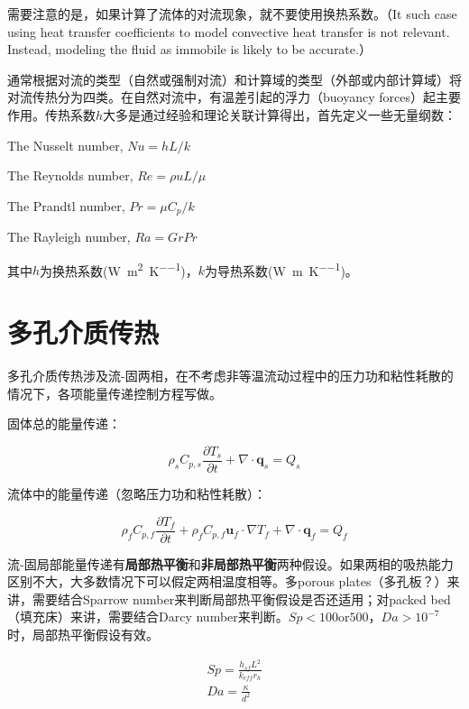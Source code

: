 需要注意的是，如果计算了流体的对流现象，就不要使用换热系数。（It such case using heat transfer coefficients to model convective heat transfer is not relevant. Instead, modeling the fluid as immobile is likely to be accurate.）

通常根据对流的类型（自然或强制对流）和计算域的类型（外部或内部计算域）将对流传热分为四类。在自然对流中，有温差引起的浮力（buoyancy forces）起主要作用。传热系数$h$大多是通过经验和理论关联计算得出，首先定义一些无量纲数：

The Nusselt number, $Nu=hL/k$

The Reynolds number, $Re=\rho uL/\mu$

The Prandtl number, $Pr=\mu C_{p}/k$

The Rayleigh number, $Ra=GrPr$

其中$h$为换热系数(\si{\watt\per\square\meter\per\kelvin})，$k$为导热系数(\si{\watt\per\meter\per\kelvin})。

\section{多孔介质传热}
多孔介质传热涉及流-固两相，在不考虑非等温流动过程中的压力功和粘性耗散的情况下，各项能量传递控制方程写做。

固体总的能量传递：

\begin{equation}\label{solid-heat}
\rho_s C_{p,s} \frac{\partial T_s}{\partial t}+ \nabla\cdot\bm{q}_s = Q_s
\end{equation}

流体中的能量传递（忽略压力功和粘性耗散）：

\begin{equation}\label{fluid-heat}
\rho_f C_{p,f} \frac{\partial T_f}{\partial t} + \rho_f C_{p,f}\bm{u}_f\cdot\nabla T_f + \nabla\cdot\bm{q}_f = Q_f
\end{equation}

流-固局部能量传递有\textbf{局部热平衡}和\textbf{非局部热平衡}两种假设。如果两相的吸热能力区别不大，大多数情况下可以假定两相温度相等。多porous plates（多孔板？）来讲，需要结合Sparrow number来判断局部热平衡假设是否还适用；对packed bed（填充床）来讲，需要结合Darcy number来判断。$ Sp<100 \text{or} 500 $，$ Da>10^{-7} $时，局部热平衡假设有效。

\begin{gather}
Sp = \frac{h_{sf}L^2}{k_{eff}r_h} \\
Da = \frac{\kappa}{d^2}
\end{gather}

